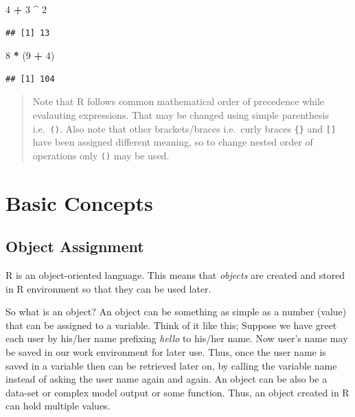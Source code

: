 \documentclass[
]{book}
\newenvironment{Shaded}{\begin{snugshade}}{\end{snugshade}}
\newcommand{\DecValTok}[1]{\textcolor[rgb]{0.00,0.00,0.81}{#1}}
\newcommand{\NormalTok}[1]{#1}
\newcommand{\SpecialCharTok}[1]{\textcolor[rgb]{0.81,0.36,0.00}{\textbf{#1}}}
\begin{document}
\begin{Shaded}
\begin{Highlighting}[]
\DecValTok{4} \SpecialCharTok{+} \DecValTok{3} \SpecialCharTok{\^{}} \DecValTok{2}
\end{Highlighting}
\end{Shaded}

\begin{verbatim}
## [1] 13
\end{verbatim}

\begin{Shaded}
\begin{Highlighting}[]
\DecValTok{8} \SpecialCharTok{*}\NormalTok{ (}\DecValTok{9} \SpecialCharTok{+} \DecValTok{4}\NormalTok{)}
\end{Highlighting}
\end{Shaded}

\begin{verbatim}
## [1] 104
\end{verbatim}

\begin{quote}
Note that R follows common mathematical order of precedence while evalauting expressions. That may be changed using simple parenthesis i.e.~\texttt{()}. Also note that other brackets/braces i.e.~curly braces \texttt{\{\}} and \texttt{{[}{]}} have been assigned different meaning, so to change nested order of operations only \texttt{()} may be used.
\end{quote}

\hypertarget{basic-concepts}{%
\section{Basic Concepts}\label{basic-concepts}}

\hypertarget{object-assignment}{%
\subsection{Object Assignment}\label{object-assignment}}

R is an object-oriented language.\citep{R-base} This means that \emph{objects} are created and stored in R environment so that they can be used later.

So what is an object? An object can be something as simple as a number (value) that can be assigned to a variable. Think of it like this; Suppose we have greet each user by his/her name prefixing \emph{hello} to his/her name. Now user's name may be saved in our work environment for later use. Thus, once the user name is saved in a variable then can be retrieved later on, by calling the variable name instead of asking the user name again and again. An object can be also be a data-set or complex model output or some function. Thus, an object created in R can hold multiple values.
\end{document}
